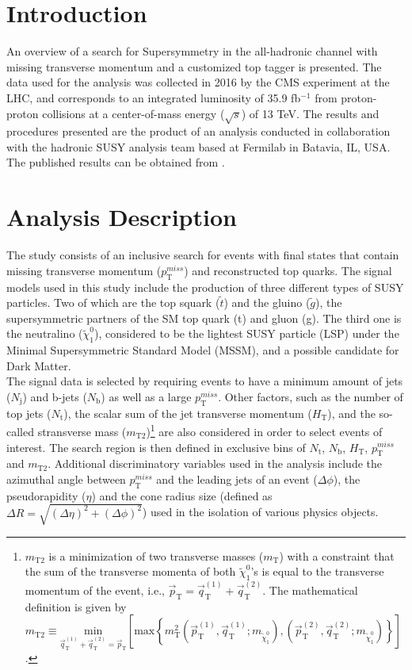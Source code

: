 \section{Introduction}

An overview of a search for Supersymmetry in the all-hadronic channel with missing transverse momentum and a customized top tagger is presented. The data used for the analysis was collected in 2016 by the CMS experiment at the LHC, and corresponds to an integrated luminosity of 35.9 fb$^{-1}$ from proton-proton collisions at a center-of-mass energy ($\sqrt{s}$) of 13 TeV. The results and procedures presented are the product of an analysis conducted in collaboration with the hadronic SUSY analysis team based at Fermilab in Batavia, IL, USA. The published results can be obtained from \cite{SUSYanalysis}.

\section{Analysis Description}

The study consists of an inclusive search for events with final states that contain missing transverse momentum ($p_{\text{T}}^{miss}$) and reconstructed top quarks. The signal models used in this study include the production of three different types of SUSY particles. Two of which are the top squark ($\tilde{t}$) and the gluino ($\tilde{g}$), the supersymmetric partners of the SM top quark (t) and gluon (g). The third one is the neutralino ($\tilde{\chi}_{1}^{0}$), considered to be the lightest SUSY particle (LSP) under the Minimal Supersymmetric Standard Model (MSSM), and a possible candidate for Dark Matter.\\

The signal data is selected by requiring events to have a minimum amount of jets ($N_\text{j}$) and b-jets ($N_\text{b}$) as well as a large $p_{\text{T}}^{miss}$. Other factors, such as the number of top jets ($N_\text{t}$), the scalar sum of the jet transverse momentum ($H_\text{T}$), and the so-called stransverse mass ($m_\text{T2}$)\footnote{$m_\text{T2}$ is a minimization of two transverse masses ($m_\text{T}$) with a constraint that the sum of the transverse momenta of both $\tilde{\chi}_{1}^{0}$'s is equal to the transverse momentum of the event, i.e., $\vec{p}_\text{T} = \vec{q}_\text{T}^{(1)} + \vec{q}_\text{T}^{(2)}$. The mathematical definition is given by $m_\text{T2} \equiv \underset{\vec{q}_\text{T}^{(1)} + \vec{q}_\text{T}^{(2)} = \vec{p}_\text{T}}{\text{min}}\left [ \text{max}\left \{ m_\text{T}^2 (\vec{p}_\text{T}^{(1)}, \vec{q}_\text{T}^{(1)}; m_{\tilde{\chi}_{1}^{0}}), (\vec{p}_\text{T}^{(2)}, \vec{q}_\text{T}^{(2)}; m_{\tilde{\chi}_{1}^{0}}) \right \} \right ]$.} are also considered in order to select events of interest. The search region is then defined in exclusive bins of $N_\text{t}$, $N_\text{b}$, $H_\text{T}$, $p_{\text{T}}^{miss}$ and $m_\text{T2}$. Additional discriminatory variables used in the analysis include the azimuthal angle between $p_{\text{T}}^{miss}$ and the leading jets of an event ($\Delta\phi$), the pseudorapidity ($\eta$) and the cone radius size (defined as $\Delta R = \sqrt{(\Delta\eta)^2+(\Delta\phi)^2}$) used in the isolation of various physics objects.


